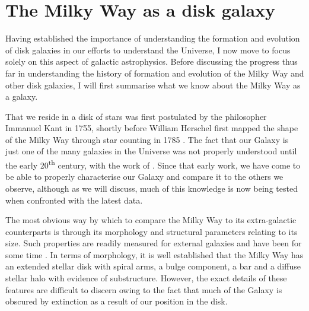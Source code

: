 \section{The Milky Way as a disk galaxy}


Having established the importance of understanding the formation and evolution of disk galaxies in our efforts to understand the Universe, I now move to focus solely on this aspect of galactic astrophysics. Before discussing the progress thus far in understanding the history of formation and evolution of the Milky Way and other disk galaxies, I will first summarise what we know about the Milky Way as a galaxy. 

That we reside in a disk of stars was first postulated by the philosopher Immanuel Kant in 1755, shortly before William Herschel first mapped the shape of the Milky Way through star counting in 1785 \citep{Herschel01011785}. The fact that our Galaxy is just one of the many galaxies in the Universe was not properly understood until the early 20\textsuperscript{th} century, with the work of \citet{1929ApJ....69..103H}. Since that early work, we have come to be able to properly characterise our Galaxy and compare it to the others we observe, although as we will discuss, much of this knowledge is now being tested when confronted with the latest data.

The most obvious way by which to compare the Milky Way to its extra-galactic counterparts is through its morphology and structural parameters relating to its size. Such properties are readily measured for external galaxies and have been for some time \citep[e.g.][]{1959HDP....53..311D}. In terms of morphology, it is well established that the Milky Way has an extended stellar disk with spiral arms, a bulge component, a bar and a diffuse stellar halo with evidence of substructure. However, the exact details of these features are difficult to discern owing to the fact that much of the Galaxy is obscured by extinction as a result of our position in the disk.


